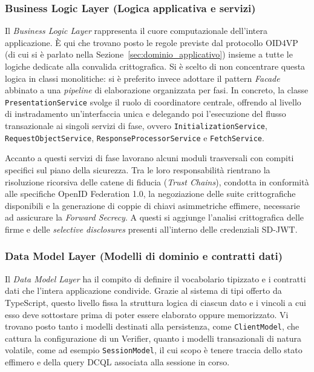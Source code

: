\subsubsection{Business Logic Layer (Logica applicativa e servizi)}
Il \textit{Business Logic Layer} rappresenta il cuore computazionale dell'intera applicazione. È qui che trovano posto le regole previste dal protocollo OID4VP (di cui si è parlato nella Sezione~\ref{sec:dominio_applicativo}) insieme a tutte le logiche dedicate alla convalida crittografica. Si è scelto di non concentrare questa logica in classi monolitiche: si è preferito invece adottare il pattern \textit{Facade} abbinato a una \textit{pipeline} di elaborazione organizzata per fasi. In concreto, la classe \texttt{PresentationService} svolge il ruolo di coordinatore centrale, offrendo al livello di instradamento un'interfaccia unica e delegando poi l'esecuzione del flusso transazionale ai singoli servizi di fase, ovvero \texttt{InitializationService}, \texttt{RequestObjectService}, \texttt{ResponseProcessorService} e \texttt{FetchService}.

Accanto a questi servizi di fase lavorano alcuni moduli trasversali con compiti specifici sul piano della sicurezza. Tra le loro responsabilità rientrano la risoluzione ricorsiva delle catene di fiducia (\textit{Trust Chains}), condotta in conformità alle specifiche OpenID Federation 1.0, la negoziazione delle suite crittografiche disponibili e la generazione di coppie di chiavi asimmetriche effimere, necessarie ad assicurare la \textit{Forward Secrecy\glsfirstoccur{}}. A questi si aggiunge l'analisi crittografica delle firme e delle \textit{selective disclosures} presenti all'interno delle credenziali SD-JWT.

\subsubsection{Data Model Layer (Modelli di dominio e contratti dati)}
Il \textit{Data Model Layer} ha il compito di definire il vocabolario tipizzato e i contratti dati che l'intera applicazione condivide. Grazie al sistema di tipi offerto da TypeScript, questo livello fissa la struttura logica di ciascun dato e i vincoli a cui esso deve sottostare prima di poter essere elaborato oppure memorizzato. Vi trovano posto tanto i modelli destinati alla persistenza, come \texttt{ClientModel}, che cattura la configurazione di un Verifier, quanto i modelli transazionali di natura volatile, come ad esempio \texttt{SessionModel}, il cui scopo è tenere traccia dello stato effimero e della query DCQL associata alla sessione in corso.

